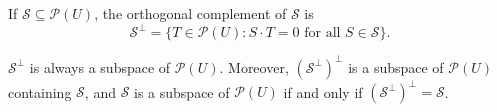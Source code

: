 If $\mathcal{S} \subseteq \mathcal{P}(U)$, the orthogonal complement of $\mathcal{S}$ is
$$\mathcal{S}^{\perp} = \{T \in \mathcal{P}(U): S \cdot T = 0 \text{ for all } S \in \mathcal{S}\}.$$

$\mathcal{S}^{\perp}$ is always a subspace of $\mathcal{P}(U)$. Moreover, $(\mathcal{S}^{\perp})^{\perp}$ is a subspace of $\mathcal{P}(U)$ containing $\mathcal{S}$, and $\mathcal{S}$ is a subspace of $\mathcal{P}(U)$ if and only if $(\mathcal{S}^{\perp})^{\perp} = \mathcal{S}$.
